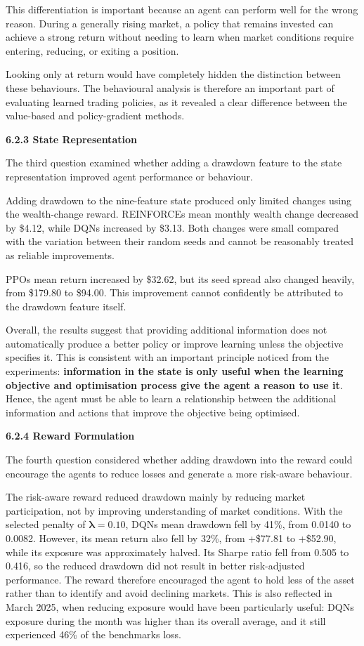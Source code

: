 This differentiation is important because an agent can perform well for
the wrong reason. During a generally rising market, a policy that
remains invested can achieve a strong return without needing to learn
when market conditions require entering, reducing, or exiting a
position.

Looking only at return would have completely hidden the distinction
between these behaviours. The behavioural analysis is therefore an
important part of evaluating learned trading policies, as it revealed a
clear difference between the value-based and policy-gradient methods.

\textbf{6.2.3 State Representation}

The third question examined whether adding a drawdown feature to the
state representation improved agent performance or behaviour.

Adding drawdown to the nine-feature state produced only limited changes
using the wealth-change reward. REINFORCE\textquotesingle s mean monthly
wealth change decreased by \$4.12, while DQN\textquotesingle s increased
by \$3.13. Both changes were small compared with the variation between
their random seeds and cannot be reasonably treated as reliable
improvements.

PPO\textquotesingle s mean return increased by \$32.62, but its seed
spread also changed heavily, from \$179.80 to \$94.00. This improvement
cannot confidently be attributed to the drawdown feature itself.

Overall, the results suggest that providing additional information does
not automatically produce a better policy or improve learning unless the
objective specifies it. This is consistent with an important principle
noticed from the experiments: \textbf{information in the state is only
useful when the learning objective and optimisation process give the
agent a reason to use it}. Hence, the agent must be able to learn a
relationship between the additional information and actions that improve
the objective being optimised.

\textbf{6.2.4 Reward Formulation}

The fourth question considered whether adding drawdown into the reward
could encourage the agents to reduce losses and generate a more
risk-aware behaviour.

The risk-aware reward reduced drawdown mainly by reducing market
participation, not by improving understanding of market conditions. With
the selected penalty of \(\mathbf{\lambda = 0.10}\),
DQN\textquotesingle s mean drawdown fell by 41\%, from 0.0140 to 0.0082.
However, its mean return also fell by 32\%, from +\$77.81 to +\$52.90,
while its exposure was approximately halved. Its Sharpe ratio fell from
0.505 to 0.416, so the reduced drawdown did not result in better
risk-adjusted performance. The reward therefore encouraged the agent to
hold less of the asset rather than to identify and avoid declining
markets. This is also reflected in March 2025, when reducing exposure
would have been particularly useful: DQN\textquotesingle s exposure
during the month was higher than its overall average, and it still
experienced 46\% of the benchmark\textquotesingle s loss.

